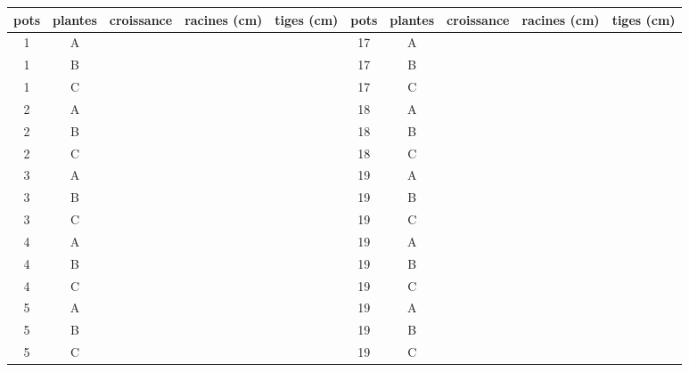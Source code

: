 \documentclass[]{article}
\begin{document}
\begin{table}[!ht]
	\footnotesize
	\begin{center}
		\begin{tabular}{| c | c | c | c | c || c | c | c | c | c |}
			\hline
			pots & plantes & croissance & racines (cm) & tiges (cm) & pots & plantes & croissance & racines (cm) & tiges (cm) \\ \hline

			1 & A &   &   &   & 17 & A &   &   &  \\
			1 & B &   &   &   & 17 & B &   &   &  \\
			1 & C &   &   &   & 17 & C &   &   &  \\ \hline

			2 & A &   &   &   & 18 & A &   &   &  \\
			2 & B &   &   &   & 18 & B &   &   &  \\
			2 & C &   &   &   & 18 & C &   &   &  \\ \hline

			3 & A &   &   &   & 19 & A &   &   &  \\
			3 & B &   &   &   & 19 & B &   &   &  \\
			3 & C &   &   &   & 19 & C &   &   &  \\ \hline

			4 & A &   &   &   & 19 & A &   &   &  \\
			4 & B &   &   &   & 19 & B &   &   &  \\
			4 & C &   &   &   & 19 & C &   &   &  \\ \hline

			5 & A &   &   &   & 19 & A &   &   &  \\
			5 & B &   &   &   & 19 & B &   &   &  \\
			5 & C &   &   &   & 19 & C &   &   &  \\
			\hline
		\end{tabular}
	\end{center}
\end{table}
\end{document}
